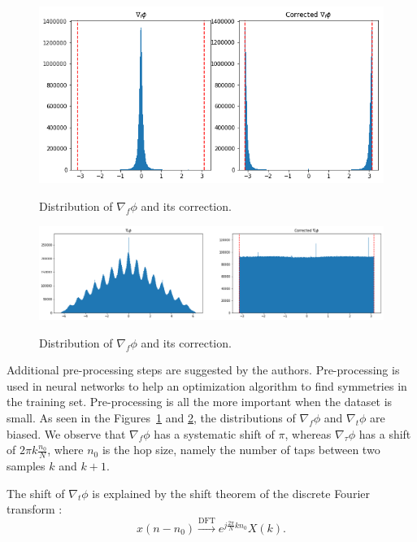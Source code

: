 \begin{figure}
	  \centering
	    \includegraphics[width=0.9\columnwidth]{dist-df.png}
	      \label{fig:dist-df}
	        \caption{Distribution of $\nabla_f\phi$ and its correction.}
	\end{figure}


\begin{figure}
	  \centering
	    \includegraphics[width=1.0\columnwidth]{dist-dt.png}
	      \label{fig:dist-dt}
	        \caption{Distribution of $\nabla_f\phi$ and its correction.}
	\end{figure}

Additional pre-processing steps are suggested by the authors.
Pre-processing is used in neural networks to help an optimization algorithm
to find symmetries in the training set. Pre-processing is all the more important when the dataset is small.
As seen in the Figures~\ref{fig:dist-df} and \ref{fig:dist-dt},
the distributions of $\nabla_f \phi$ and $\nabla_t \phi$ are biased.
We observe that $\nabla_f \phi$ has a systematic shift of $\pi$,
whereas $\nabla_\tau \phi$ has a shift of $2\pi k\frac{n_0}{N}$,
where $n_0$ is the hop size, namely the number of taps between two samples $k$ and $k+1$.

The shift of $\nabla_t \phi$ is explained by the shift theorem
of the discrete Fourier transform \cite{smith2007mathematics}:
$$x(n-n_0) \xrightarrow{\text{DFT}}
e^{j\frac{2\pi}{N}kn_0}X(k).$$
